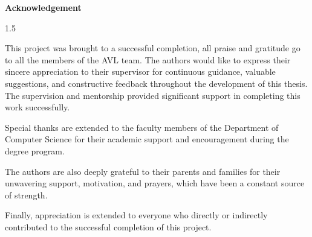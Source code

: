 
\newpage
\thispagestyle{empty}

\begin{center}
\textbf{\LARGE Acknowledgement}
\end{center}

\vspace{1cm}

\begin{spacing}{1.5}

This project was brought to a successful completion, all praise and gratitude go to all the members of the AVL team. The authors would like to express their sincere appreciation to their supervisor for continuous guidance, valuable suggestions, and constructive feedback throughout the development of this thesis. The supervision and mentorship provided significant support in completing this work successfully.

Special thanks are extended to the faculty members of the Department of Computer Science for their academic support and encouragement during the degree program.

The authors are also deeply grateful to their parents and families for their unwavering support, motivation, and prayers, which have been a constant source of strength.

Finally, appreciation is extended to everyone who directly or indirectly contributed to the successful completion of this project.

\end{spacing}

\newpage
